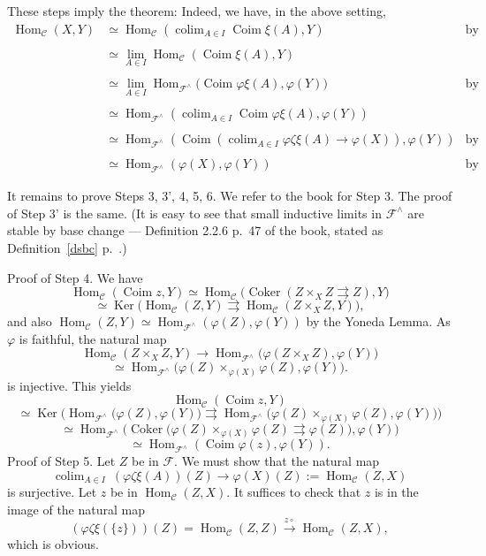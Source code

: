 \documentclass[12pt]{article}%
\theoremstyle{remark}
\theoremstyle{definition}
\newcommand{\nn}{\noindent}
\newcommand{\C}{\mathcal C}
\newcommand{\F}{\mathcal F}
\newcommand{\pp}{\varphi}
\DeclareMathOperator*{\colim}{colim}%
\DeclareMathOperator{\Coim}{Coim}
\DeclareMathOperator{\Coker}{Coker}
\DeclareMathOperator{\Hom}{Hom}%
\DeclareMathOperator{\Ker}{Ker}
\begin{document}
These steps imply the theorem: Indeed, we have, in the above setting, 
%
\begin{align*} 
%
\Hom_\C(X,Y)&\simeq\Hom_\C\left(\colim_{A\in I}\Coim\xi(A),Y\right)&\text{by Step 6}\\ \\ 
%
&\simeq\lim_{A\in I}\Hom_\C(\Coim\xi(A),Y)\\ \\ 
%
&\simeq\lim_{A\in I}\Hom_{\F^\wedge}\Big(\Coim\pp\xi(A),\pp(Y)\Big)&\text{by Step 4}\\ \\ 
%
&\simeq\Hom_{\F^\wedge}\left(\colim_{A\in I}\Coim\pp\xi(A),\pp(Y)\right)\\ \\ 
%
&\simeq\Hom_{\F^\wedge}\left(\Coim\left(\colim_{A\in I}\pp\zeta\xi(A)\to\pp(X)\right),\pp(Y)\right)&\text{by Step 3'}\\ \\ 
%
&\simeq\Hom_{\F^\wedge}(\pp(X),\pp(Y))&\text{by Step 5.}
%
\end{align*} 
%

It remains to prove Steps 3, 3', 4, 5, 6. We refer to the book for Step 3. The proof of Step 3' is the same. (It is easy to see that small inductive limits in $\F^\wedge$ are stable by base change --- Definition 2.2.6 p.~47 of the book, stated as Definition~\ref{dsbc} p.~\pageref{dsbc}.) 

\nn Proof of Step 4. We have 
$$
\Hom_\C(\Coim z,Y)\simeq\Hom_\C\big(\Coker(Z\times_XZ\rightrightarrows Z),Y\big)
$$
$$
\simeq\Ker\big(\Hom_\C(Z,Y)\rightrightarrows\Hom_\C(Z\times_XZ,Y)\big),
$$ 
and also $\Hom_\C(Z,Y)\simeq\Hom_{\F^\wedge}(\pp(Z),\pp(Y))$ by the Yoneda Lemma. As $\pp$ is faithful, the natural map 
$$
\Hom_\C(Z\times_XZ,Y)\to\Hom_{\F^\wedge}\big(\pp(Z\times_XZ),\pp(Y)\big)
$$
$$
\simeq\Hom_{\F^\wedge}\big(\pp(Z)\times_{\pp(X)}\pp(Z),\pp(Y)\big).
$$ 
is injective. This yields 
$$
\Hom_\C(\Coim z,Y)
$$
$$
\simeq\Ker\Big(\Hom_{\F^\wedge}\big(\pp(Z),\pp(Y)\big)\rightrightarrows\Hom_{\F^\wedge}\big(\pp(Z)\times_{\pp(X)}\pp(Z),\pp(Y)\big)\Big)
$$
$$
\simeq\Hom_{\F^\wedge}\Big(\Coker\big(\pp(Z)\times_{\pp(X)}\pp(Z)\rightrightarrows\pp(Z)\big),\pp(Y)\Big)
$$
$$
\simeq\Hom_{\F^\wedge}(\Coim\pp(z),\pp(Y)).
$$
Proof of Step 5. Let $Z$ be in $\F$. We must show that the natural map 
$$
\colim_{A\in I}\ (\pp\zeta\xi(A))(Z)\to\pp(X)(Z):=\Hom_\C(Z,X) 
$$
is surjective. Let $z$ be in $\Hom_\C(Z,X)$. It suffices to check that $z$ is in the image of the natural map 
$$
(\pp\zeta\xi(\{z\}))(Z)=\Hom_\C(Z,Z)\xrightarrow{z\circ}\Hom_\C(Z,X),
$$
which is obvious. 
\end{document}
